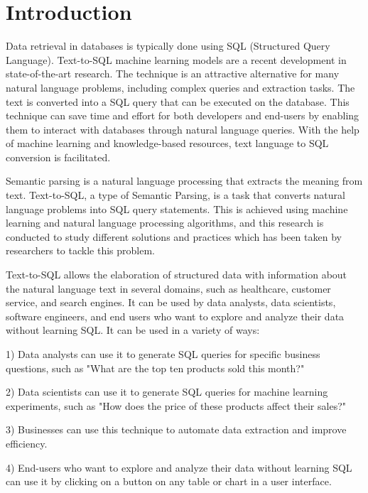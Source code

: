\makeatletter
\def\@seccntformat#1{%
  \expandafter\ifx\csname c@#1\endcsname\c@section\else
  \csname the#1\endcsname\quad
  \fi}
\makeatother
\section{Introduction}

Data retrieval in databases is typically done using SQL (Structured Query Language). Text-to-SQL machine learning models are a recent development in state-of-the-art research. The technique is an attractive alternative for many natural language problems, including complex queries and extraction tasks. The text is converted into a SQL query that can be executed on the database. This technique can save time and effort for both developers and end-users by enabling them to interact with databases through natural language queries. With the help of machine learning and knowledge-based resources, text language to SQL conversion is facilitated.

Semantic parsing is a natural language processing that extracts the meaning from text. Text-to-SQL, a type of Semantic Parsing, is a task that converts natural language problems into SQL query statements. 
This is achieved using machine learning and natural language processing algorithms, and this research is conducted to study different solutions and practices which has been taken by researchers to tackle this problem.

Text-to-SQL allows the elaboration of structured data with information about the natural language text in several domains, such as healthcare, customer service, and search engines. It can be used by data analysts, data scientists, software engineers, and end users who want to explore and analyze their data without learning SQL.
It can be used in a variety of ways:

1) Data analysts can use it to generate SQL queries for specific business questions, such as "What are the top ten products sold this month?"

2) Data scientists can use it to generate SQL queries for machine learning experiments, such as "How does the price of these products affect their sales?"

3) Businesses can use this technique to automate data extraction and improve efficiency.

4) End-users who want to explore and analyze their data without learning SQL can use it by clicking on a button on any table or chart in a user interface.

